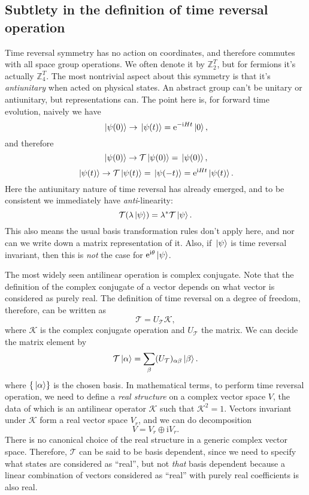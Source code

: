 \documentclass[hyperref, a4paper]{article}
\newcommand*{\ii}{\mathrm{i}}
\newcommand*{\ee}{\mathrm{e}}
\begin{document}
\subsection{Subtlety in the definition of time reversal operation}

Time reversal symmetry has no action on coordinates, and therefore commutes with all space group operations.
We often denote it by $\mathbb{Z}_2^T$, but for fermions it's actually $\mathbb{Z}_4^T$. The most nontrivial aspect about this symmetry is that it's \emph{antiunitary}
when acted on physical states. An abstract group can't be unitary or antiunitary, but representations can.
The point here is, for forward time evolution, naively we have 
\[
    \ket*{\psi(0)} \to \ket*{\psi(t)} = \ee^{- \ii H t} \ket*{0},
\]
and therefore 
\[
    \ket*{\psi(0)} \to \mathcal{T} \ket*{\psi(0)} = \ket*{\psi(0)},
\]
\[
    \ket*{\psi(t)} \to \mathcal{T} \ket*{\psi(t)} = \ket*{\psi(-t)} = \ee^{\ii H t} \ket*{\psi(t)}.
\]
Here the antiunitary nature of time reversal has already emerged, and to be consistent we immediately have 
\emph{anti}-linearity:
\begin{equation}
    \mathcal{T} (\lambda \ket*{\psi}) = \lambda^* \mathcal{T} \ket*{\psi}.
\end{equation}
This also means the usual basis transformation rules don't apply here, and nor can we write down a matrix 
representation of it. Also, if $\ket*{\psi}$ is time reversal invariant, then this is \emph{not} the case 
for $\ee^{\ii \theta} \ket*{\psi}$. 

The most widely seen antilinear operation is complex conjugate. Note that the definition of the complex 
conjugate of a vector depends on what vector is considered as purely real. 
The definition of time reversal on a degree of freedom, therefore, can be written as
\begin{equation}
    \mathcal{T} = U_{\mathcal{T}} \mathcal{K},
\end{equation}
where $\mathcal{K}$ is the complex conjugate operation and $U_\mathcal{T}$ the matrix. We can decide the 
matrix element by 
\begin{equation}
    \mathcal{T} \ket*{\alpha} = \sum_\beta (U_\mathcal{T})_{\alpha \beta }\ket*{\beta}.
\end{equation}
where $\{\ket*{\alpha}\}$ is the chosen basis. 
In mathematical terms, to perform time reversal operation, we need to define a \emph{real structure} on a 
complex vector space $V$, the data of which is an antilinear operator $\mathcal{K}$ such that $\mathcal{K}^2 = 1$.
Vectors invariant under $\mathcal{K}$ form a real vector space $V_r$, and we can do decomposition 
\begin{equation}
    V = V_r \oplus \ii V_r.
\end{equation}
There is no canonical choice of the real structure in a generic complex vector space.
Therefore, $\mathcal{T}$ can be said to be basis dependent, since we need to specify what states are 
considered as ``real'', but not \emph{that} basis dependent because a linear combination of 
vectors considered as ``real'' with purely real coefficients is also real.
\end{document}
